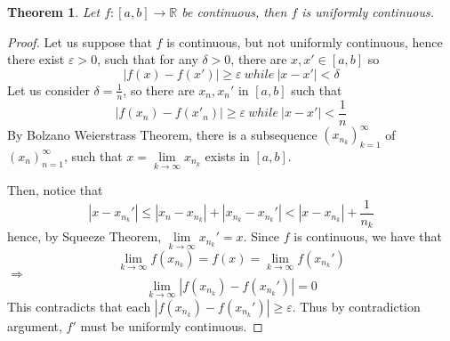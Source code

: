 \documentclass[12pt]{article}
\theoremstyle{plain}
\newtheorem{theorem}{Theorem}[subsection]
\newcommand{\abs}[1]{\left| #1 \right|}
\newcommand{\ep}{\varepsilon}
\newcommand{\dlim}{\displaystyle\lim\limits}
\begin{document}
	\begin{theorem}
		Let $f:[a,b]\to \mathbb{R}$ be continuous, 
		then  $f$ is uniformly continuous. 
	\end{theorem}
	\begin{proof}
		Let us suppose that $f$ is continuous, but not uniformly continuous,
		hence there exist $\ep>0$, such that for any $\delta>0$, 
		there are $x, x' \in [a,b]$ so 
		\[
			\abs{f(x)-f(x')}\geq \ep \ while \ \abs{x-x'} < \delta
		\]
		Let us consider $\delta = \frac 1n$, so there are $x_n, x_n'$ in $[a,b]$
		such that 
		\[
			\abs{f(x_n)-f(x'_n)}\geq \ep \ while \ \abs{x-x'} < \frac 1n
		\]
		By Bolzano Weierstrass Theorem, there is a subsequence
		$(x_{n_k})_{k=1}^{\infty}$ of $(x_n)_{n=1}^{\infty}$, such that 
		$x=\dlim_{k\to\infty} x_{n_k}$ exists in $[a,b]$. 

		Then, notice that 
		\[
			\abs{x-x_{n_k}'} \leq \abs{x_n-x_{n_k}}+\abs{x_{n_k}-x_{n_k}'}
			<\abs{x-x_{n_k}}+\frac 1{n_k} 
		\]
		hence, by Squeeze Theorem, $\dlim_{k\to\infty} x_{n_k}'=x$. 
		Since $f$ is continuous, we have that 
		\[
			\lim_{k\to\infty} f(x_{n_k}) = f(x) = \lim_{k\to\infty}f(x_{n_k}')
		\]
		$\Rightarrow$
		\[
			\lim_{k\to\infty} \abs{f(x_{n_k})-f(x_{n_k}')}=0
		\]
		This contradicts that each $\abs{f(x_{n_k})-f(x_{n_k}')}\geq \ep$. 
		Thus by contradiction argument, $f'$ must be uniformly continuous. 
	\end{proof}
	
\end{document}
